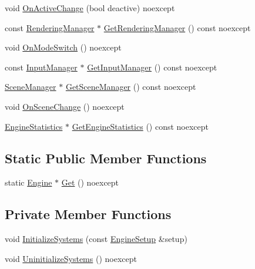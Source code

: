 \begin{DoxyCompactItemize}
\item 
void \hyperlink{classmage_1_1_engine_afd52a8088d6d37605cb352028098c508}{On\+Active\+Change} (bool deactive) noexcept
\item 
const \hyperlink{classmage_1_1_rendering_manager}{Rendering\+Manager} $\ast$ \hyperlink{classmage_1_1_engine_ae3d894eacf94cdf416d95c57e45b4836}{Get\+Rendering\+Manager} () const noexcept
\item 
void \hyperlink{classmage_1_1_engine_a6ac289fd093967c370955810e26d251f}{On\+Mode\+Switch} () noexcept
\item 
const \hyperlink{classmage_1_1_input_manager}{Input\+Manager} $\ast$ \hyperlink{classmage_1_1_engine_a9e8de859024c2b51d9b20ce498d6c07b}{Get\+Input\+Manager} () const noexcept
\item 
\hyperlink{classmage_1_1_scene_manager}{Scene\+Manager} $\ast$ \hyperlink{classmage_1_1_engine_adaec74f633fe6ed3a3e2ec745cd57343}{Get\+Scene\+Manager} () const noexcept
\item 
void \hyperlink{classmage_1_1_engine_a4bcc8811433865c349c8cc862d4f457d}{On\+Scene\+Change} () noexcept
\item 
\hyperlink{classmage_1_1_engine_statistics}{Engine\+Statistics} $\ast$ \hyperlink{classmage_1_1_engine_aacbd029d5e8f00e0acdb0f4d7cc04236}{Get\+Engine\+Statistics} () const noexcept
\end{DoxyCompactItemize}
\subsection*{Static Public Member Functions}
\begin{DoxyCompactItemize}
\item 
static \hyperlink{classmage_1_1_engine}{Engine} $\ast$ \hyperlink{classmage_1_1_engine_a146c8898afd978b4d1f0528128a43bbf}{Get} () noexcept
\end{DoxyCompactItemize}
\subsection*{Private Member Functions}
\begin{DoxyCompactItemize}
\item 
void \hyperlink{classmage_1_1_engine_a29a47448fb182b110d46d287a72b8b4e}{Initialize\+Systems} (const \hyperlink{classmage_1_1_engine_setup}{Engine\+Setup} \&setup)
\item 
void \hyperlink{classmage_1_1_engine_ac0632bce91156f13d4bc76f5b25fc94b}{Uninitialize\+Systems} () noexcept
\end{DoxyCompactItemize}
